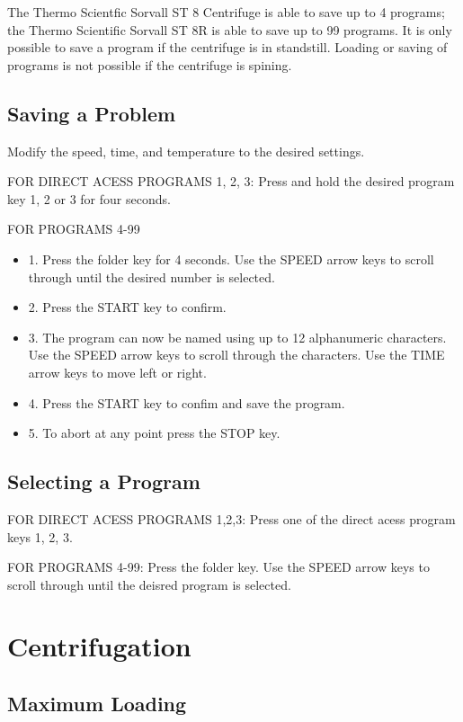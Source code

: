 \documentclass[12pt]{../SOP3_beta}
\begin{document}
\NP The Thermo Scientfic Sorvall ST 8 Centrifuge is able to save up to 4 programs; the Thermo Scientific Sorvall ST 8R is able to save up to 99 programs. It is only possible to save a program if the centrifuge is in standstill. Loading or saving of programs is not possible if the centrifuge is spining. 

\subsection*{Saving a Problem}

\NP Modify the speed, time, and temperature to the desired settings. 

\NP FOR DIRECT ACESS PROGRAMS 1, 2, 3: Press and hold the desired program key 1, 2 or 3 for four seconds. 

\NP FOR PROGRAMS 4-99

\begin{itemize}
  \item 1. Press the folder key for 4 seconds. Use the SPEED arrow keys to scroll through until the desired number is selected.
  \item 2. Press the START key to confirm.
  \item 3. The program can now be named using up to 12 alphanumeric characters. Use the SPEED arrow keys to scroll through the characters. Use the TIME arrow keys to move left or right.
  \item 4. Press the START key to confim and save the program. 
  \item 5. To abort at any point press the STOP key.
\end{itemize}

\subsection*{Selecting a Program}

\NP FOR DIRECT ACESS PROGRAMS 1,2,3: Press one of the direct acess program keys 1, 2, 3.

\NP FOR PROGRAMS 4-99: Press the folder key. Use the SPEED arrow keys to scroll through until the deisred program is selected. 

\section{Centrifugation}

\subsection*{Maximum Loading}
\end{document}
